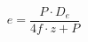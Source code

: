 \documentclass[12pt]{article}
\begin{document}
\begin{displaymath}
e = \frac {P \cdot D_e} {4f \cdot z + P}
\end{displaymath}
\end{document}
